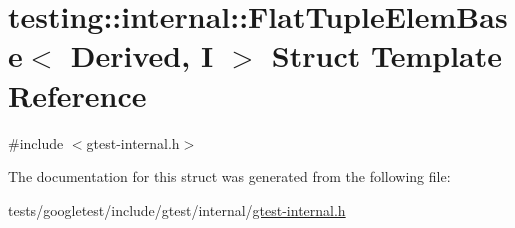 \hypertarget{structtesting_1_1internal_1_1FlatTupleElemBase}{}\section{testing\+:\+:internal\+:\+:Flat\+Tuple\+Elem\+Base$<$ Derived, I $>$ Struct Template Reference}
\label{structtesting_1_1internal_1_1FlatTupleElemBase}


{\ttfamily \#include $<$gtest-\/internal.\+h$>$}



The documentation for this struct was generated from the following file\+:\begin{DoxyCompactItemize}
\item 
tests/googletest/include/gtest/internal/\hyperlink{gtest-internal_8h}{gtest-\/internal.\+h}\end{DoxyCompactItemize}
